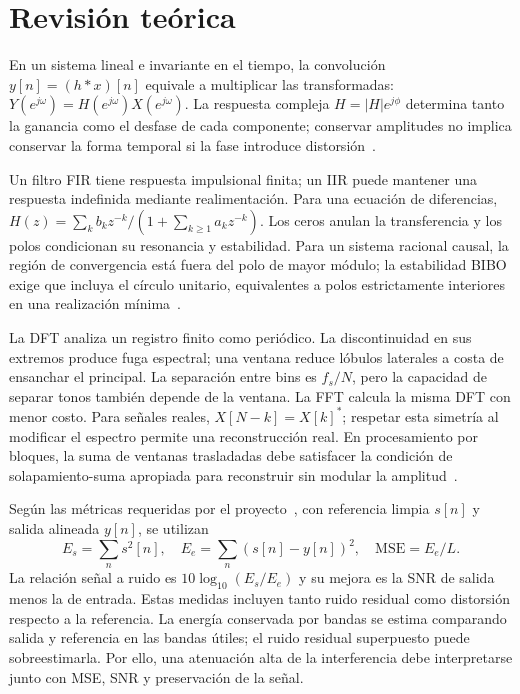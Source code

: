 \section{Revisión teórica}
\label{sec:teoria}
En un sistema lineal e invariante en el tiempo, la convolución
$y[n]=(h*x)[n]$ equivale a multiplicar las transformadas:
$Y(e^{j\omega})=H(e^{j\omega})X(e^{j\omega})$.
La respuesta compleja $H=|H|e^{j\phi}$ determina tanto la ganancia como
el desfase de cada componente; conservar amplitudes no implica conservar
la forma temporal si la fase introduce distorsión~\cite{smith_filtros}.

Un filtro FIR tiene respuesta impulsional finita; un IIR puede mantener una
respuesta indefinida mediante realimentación. Para una ecuación de diferencias,
$H(z)=\sum_k b_kz^{-k}/(1+\sum_{k\geq1}a_kz^{-k})$.
Los ceros anulan la transferencia y los polos condicionan su resonancia y
estabilidad. Para un sistema racional causal, la región de convergencia está
fuera del polo de mayor módulo; la estabilidad BIBO exige que incluya el círculo
unitario, equivalentes a polos estrictamente interiores en una realización
mínima~\cite{smith_filtros}.

La DFT analiza un registro finito como periódico. La discontinuidad en sus
extremos produce fuga espectral; una ventana reduce lóbulos laterales a costa
de ensanchar el principal. La separación entre bins es $f_s/N$, pero la
capacidad de separar tonos también depende de la ventana. La FFT calcula la
misma DFT con menor costo. Para señales reales,
$X[N-k]=X[k]^*$; respetar esta simetría al modificar el espectro permite una
reconstrucción real. En procesamiento por bloques, la suma de ventanas
trasladadas debe satisfacer la condición de solapamiento-suma apropiada para
reconstruir sin modular la amplitud~\cite{smith_espectral}.

Según las métricas requeridas por el proyecto~\cite{enunciado_proyecto}, con
referencia limpia $s[n]$ y salida alineada $y[n]$, se utilizan
\begin{equation}
 E_s=\sum_n s^2[n],\quad E_e=\sum_n(s[n]-y[n])^2,
 \quad \mathrm{MSE}=E_e/L.
\end{equation}
La relación señal a ruido es $10\log_{10}(E_s/E_e)$ y su mejora es la
SNR de salida menos la de entrada. Estas medidas incluyen tanto ruido residual
como distorsión respecto a la referencia. La energía conservada por bandas se
estima comparando salida y referencia en las bandas útiles; el ruido residual
superpuesto puede sobreestimarla. Por ello, una atenuación alta de la
interferencia debe interpretarse junto con MSE, SNR y preservación de la señal.
